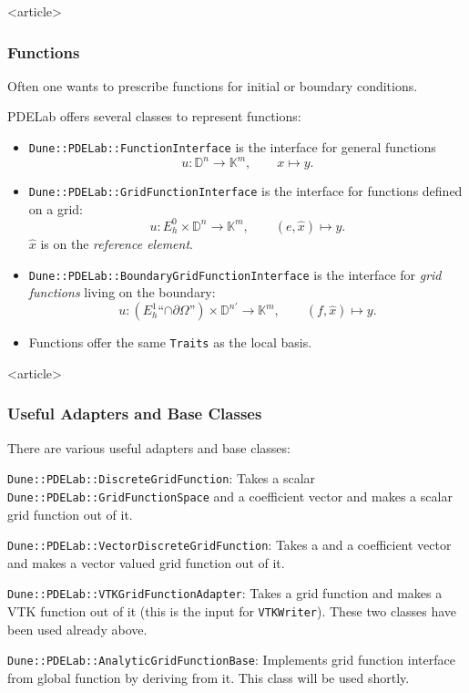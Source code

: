 \begin{frame}<article>
\frametitle{Functions}
Often one wants to prescribe functions for initial or boundary
conditions.

PDELab offers several classes to represent functions:
\begin{itemize}
\item \lstinline{Dune::PDELab::FunctionInterface} is the interface for general
functions $$u : \mathbb{D}^n \to \mathbb{K}^m, \qquad x \mapsto y.$$ 
\item \lstinline{Dune::PDELab::GridFunctionInterface} is the interface
for functions defined on a grid:
$$u : E_h^0 \times \mathbb{D}^n \to \mathbb{K}^m, \qquad
(e,\hat{x}) \mapsto y.$$
$\hat{x}$ is on the \textit{reference element}.
\item \lstinline{Dune::PDELab::BoundaryGridFunctionInterface} is the
interface for \textit{grid functions} living on the boundary:
$$u : (E_h^1\text{``$\cap\partial\Omega$''}) \times \mathbb{D}^{n'} \to \mathbb{K}^m, \qquad
(f,\hat{x}) \mapsto y.$$
\item Functions offer the same \lstinline{Traits} as the local basis.
\end{itemize}
\end{frame}


\begin{frame}<article>
\frametitle{Useful Adapters and Base Classes}
There are various useful adapters and base classes:

\lstinline{Dune::PDELab::DiscreteGridFunction}: Takes a scalar
\lstinline{Dune::PDELab::GridFunctionSpace}
and a coefficient vector and makes a scalar grid function out
of it.

\lstinline{Dune::PDELab::VectorDiscreteGridFunction}: Takes a 
and a coefficient vector and makes a vector valued grid function out
of it.

\lstinline{Dune::PDELab::VTKGridFunctionAdapter}: Takes a grid
function and makes a VTK function out of it (this is the input
for \lstinline{VTKWriter}). These two classes have been used already above.

\lstinline{Dune::PDELab::AnalyticGridFunctionBase}: Implements
grid function interface from global function by deriving from it.
This class will be used shortly.

\end{frame}

